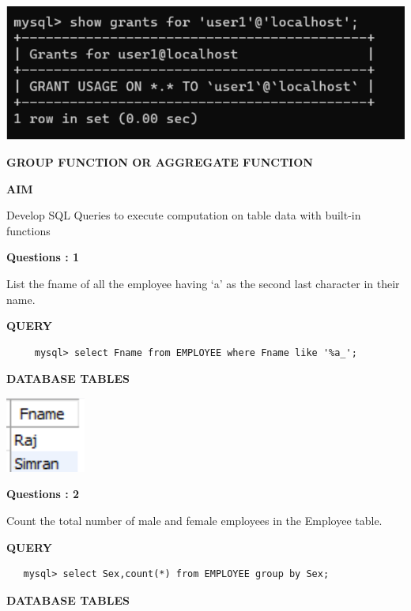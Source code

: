 \documentclass[a4paper,12pt]{report}
\begin{document}
\includegraphics[scale=1.1]{REVOKE.png}
\newpage
\begin{center}
		\large\textbf{GROUP FUNCTION OR AGGREGATE FUNCTION}
	\end{center}
	
	\begin{flushleft}
		\textbf{AIM }
	\end{flushleft} 
	   Develop SQL Queries to execute computation on table data with built-in functions
\begin{flushleft}
    \textbf{Questions : 1}
\end{flushleft}
List the fname of all the employee having ‘a’ as the second last character in their name.	
	\begin{flushleft}
		\textbf{QUERY }
	\end{flushleft}
 \begin{verbatim}
     mysql> select Fname from EMPLOYEE where Fname like '%a_';
 \end{verbatim}
\begin{flushleft}
		\textbf{DATABASE TABLES} 
\end{flushleft} 

\includegraphics[scale=1.2]{Q1.png}
\begin{flushleft}
    \textbf{Questions : 2}
\end{flushleft}
Count the total number of male and female employees in the Employee table.
	\begin{flushleft}
		\textbf{QUERY }
	\end{flushleft}
 \begin{verbatim}
   mysql> select Sex,count(*) from EMPLOYEE group by Sex;  
 \end{verbatim}
\begin{flushleft}
		\textbf{DATABASE TABLES} 
\end{flushleft} 
\end{document}

